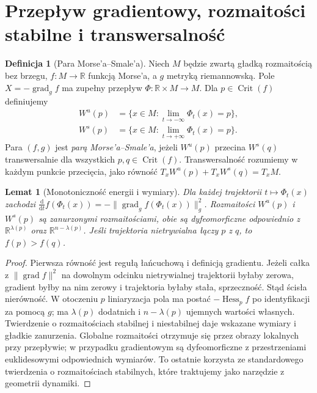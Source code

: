 \documentclass[11pt,a4paper,oneside]{report}
\newcommand{\R}{\mathbb{R}}
\newcommand{\dd}{\mathrm d}
\theoremstyle{plain}
\newtheorem{lemat}[twierdzenie]{Lemat}
\theoremstyle{definition}
\newtheorem{definicja}[twierdzenie]{Definicja}
\theoremstyle{remark}
\begin{document}
\section{Przepływ gradientowy, rozmaitości stabilne i transwersalność}
\begin{definicja}[Para Morse'a--Smale'a]
Niech $M$ będzie zwartą gładką rozmaitością bez brzegu,
$f:M\to\R$ funkcją Morse'a, a $g$ metryką riemannowską.
Pole $X=-\operatorname{grad}_g f$ ma zupełny przepływ
$\Phi:\R\times M\to M$. Dla $p\in\operatorname{Crit}(f)$ definiujemy
\begin{align*}
 W^u(p)&=\{x\in M:\lim_{t\to-\infty}\Phi_t(x)=p\},\\
 W^s(p)&=\{x\in M:\lim_{t\to+\infty}\Phi_t(x)=p\}.
\end{align*}
Para $(f,g)$ jest \emph{parą Morse'a--Smale'a}, jeżeli
$W^u(p)$ przecina $W^s(q)$ transwersalnie dla wszystkich
$p,q\in\operatorname{Crit}(f)$. Transwersalność rozumiemy w każdym
punkcie przecięcia, jako równość $T_xW^u(p)+T_xW^s(q)=T_xM$.
\end{definicja}

\begin{lemat}[Monotoniczność energii i wymiary]
\label{lem:morse-energy-v10}
Dla każdej trajektorii $t\mapsto\Phi_t(x)$ zachodzi
$\frac{\dd}{\dd t}f(\Phi_t(x))=-\|\operatorname{grad}_g f(\Phi_t(x))\|_g^2$.
Rozmaitości $W^u(p)$ i $W^s(p)$ są zanurzonymi rozmaitościami,
obie są dyfeomorficzne odpowiednio z $\R^{\lambda(p)}$ oraz
$\R^{n-\lambda(p)}$. Jeśli trajektoria nietrywialna łączy
$p$ z $q$, to $f(p)>f(q)$.
\end{lemat}
\begin{proof}
Pierwsza równość jest regułą łańcuchową i definicją gradientu.
Jeżeli całka z $\|\operatorname{grad}f\|^2$ na dowolnym odcinku
nietrywialnej trajektorii byłaby zerowa, gradient byłby na nim zerowy
i trajektoria byłaby stała, sprzeczność. Stąd ścisła nierówność.
W otoczeniu $p$ liniaryzacja pola ma postać
$-\operatorname{Hess}_pf$ po identyfikacji za pomocą $g$; ma
$\lambda(p)$ dodatnich i $n-\lambda(p)$ ujemnych wartości własnych.
Twierdzenie o rozmaitościach stabilnej i niestabilnej daje wskazane
wymiary i gładkie zanurzenia. Globalne rozmaitości otrzymuje się
przez obrazy lokalnych przy przepływie; w przypadku gradientowym
są dyfeomorficzne z przestrzeniami euklidesowymi odpowiednich wymiarów.
To ostatnie korzysta ze standardowego twierdzenia o rozmaitościach
stabilnych, które traktujemy jako narzędzie z geometrii dynamiki.
\end{proof}
\end{document}
